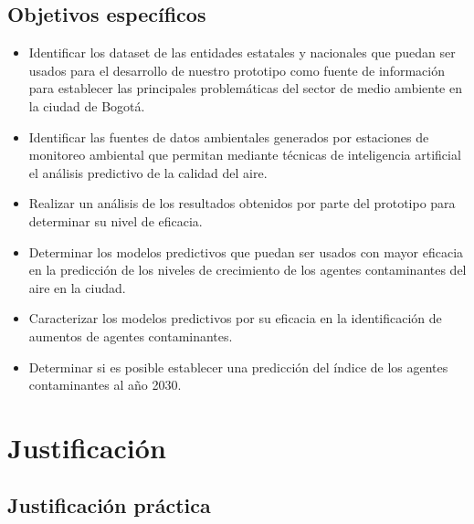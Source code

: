 \subsection{Objetivos específicos}

\begin{itemize}
	\item Identificar los dataset de las entidades estatales y nacionales que puedan ser usados para el desarrollo de nuestro prototipo como fuente de información para establecer las principales problemáticas del sector de medio ambiente en la ciudad de Bogotá.
	\item Identificar las fuentes de datos ambientales generados por estaciones de monitoreo ambiental que permitan mediante técnicas de inteligencia artificial el análisis predictivo de la calidad del aire.
	\item Realizar un análisis de los resultados obtenidos por parte del prototipo para determinar su nivel de eficacia.
	\item Determinar los modelos predictivos que puedan ser usados con mayor eficacia en la predicción de los niveles de crecimiento de los agentes contaminantes del aire en la ciudad.
	\item Caracterizar los modelos predictivos por su eficacia en la identificación de aumentos de agentes contaminantes.
	\item Determinar si es posible establecer una predicción del índice de los agentes contaminantes al año 2030.
\end{itemize}

\section{Justificación}

\subsection{Justificación práctica}

